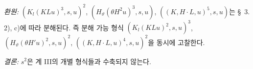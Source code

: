 
\noindent\emph{환원:} $(K_l(KLu)^3,s,u)^2$, $(H_\vartheta(\theta H^2u)^3,s,u)$, $((K,H\cdot L,u)^5,s,u)$는 \S\ 3. 2), c)에 따라 분해된다. 즉 분해 가능 형식 $(K_l(KLu)^2,s,u)^3$, $(H_\vartheta(\theta H'u)^2,s,u)^2$, $((K,H\cdot L,u)^4,s,u)^2$을 동시에 고찰한다.

\noindent\emph{결론:} $s^2$은 계 III의 개별 형식들과 수축되지 않는다.
